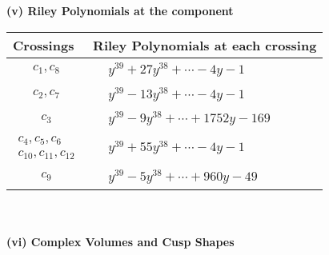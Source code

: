 \documentclass[1p]{elsarticle_modified}
\theoremstyle{definition}
\begin{document}
\newpage\renewcommand{\arraystretch}{1}
\flushleft \textbf{(v) Riley Polynomials at the component}\newline \\
\begin{tabular}{m{50pt}|m{274pt}}
Crossings & \hspace{64pt}Riley Polynomials at each crossing \\
\hline $$\begin{aligned}c_{1},c_{8}\end{aligned}$$&$\begin{aligned}
&y^{39}+27 y^{38}+\cdots-4 y-1
\end{aligned}$\\
\hline $$\begin{aligned}c_{2},c_{7}\end{aligned}$$&$\begin{aligned}
&y^{39}-13 y^{38}+\cdots-4 y-1
\end{aligned}$\\
\hline $$\begin{aligned}c_{3}\end{aligned}$$&$\begin{aligned}
&y^{39}-9 y^{38}+\cdots+1752 y-169
\end{aligned}$\\
\hline $$\begin{aligned}c_{4},c_{5},c_{6}\\c_{10},c_{11},c_{12}\end{aligned}$$&$\begin{aligned}
&y^{39}+55 y^{38}+\cdots-4 y-1
\end{aligned}$\\
\hline $$\begin{aligned}c_{9}\end{aligned}$$&$\begin{aligned}
&y^{39}-5 y^{38}+\cdots+960 y-49
\end{aligned}$\\
\hline
\end{tabular}\\~\\
\newpage\flushleft \textbf{(vi) Complex Volumes and Cusp Shapes}
\end{document}
